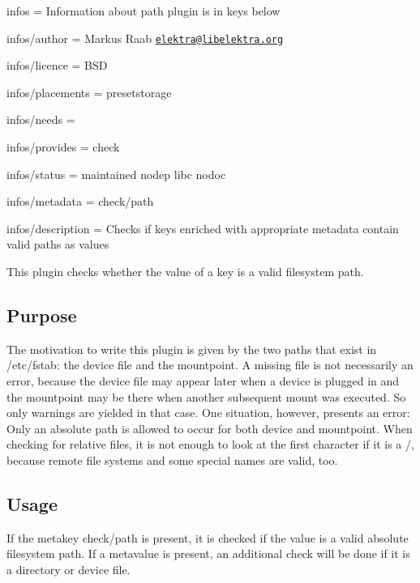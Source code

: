 
\begin{DoxyItemize}
\item infos = Information about path plugin is in keys below
\item infos/author = Markus Raab \href{mailto:elektra@libelektra.org}{\tt elektra@libelektra.\+org}
\item infos/licence = B\+S\+D
\item infos/placements = presetstorage
\item infos/needs =
\item infos/provides = check
\item infos/status = maintained nodep libc nodoc
\item infos/metadata = check/path
\item infos/description = Checks if keys enriched with appropriate metadata contain valid paths as values
\end{DoxyItemize}

This plugin checks whether the value of a key is a valid filesystem path.

\subsection*{Purpose}

The motivation to write this plugin is given by the two paths that exist in /etc/fstab\+: the device file and the mountpoint. A missing file is not necessarily an error, because the device file may appear later when a device is plugged in and the mountpoint may be there when another subsequent mount was executed. So only warnings are yielded in that case. One situation, however, presents an error\+: Only an absolute path is allowed to occur for both device and mountpoint. When checking for relative files, it is not enough to look at the first character if it is a {\ttfamily /}, because remote file systems and some special names are valid, too.

\subsection*{Usage}

If the metakey {\ttfamily check/path} is present, it is checked if the value is a valid absolute filesystem path. If a metavalue is present, an additional check will be done if it is a directory or device file. 